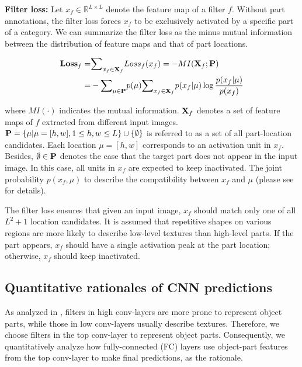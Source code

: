 \documentclass[10pt,twocolumn,letterpaper]{article}
\begin{document}
\textbf{Filter loss:} Let $x_{f}\in\mathbb{R}^{L\times L}$ denote the feature map of a filter $f$. Without part annotations, the filter loss forces $x_{f}$ to be exclusively activated by a specific part of a category. We can summarize the filter loss as the minus mutual information between the distribution of feature maps and that of part locations.
\begin{small}
\begin{equation}
\begin{split}
{\bf Loss}_{f}=&{\sum}_{x_{f}\in{\bf X}_{f}}Loss_{f}(x_{f})=-MI({\bf X}_{f};{\bf P})\\
=&-{\sum}_{\mu\in{\bf P}}p(\mu){\sum}_{x_{f}\in{\bf X}_{f}}p(x_{f}|\mu)\log\frac{p(x_{f}|\mu)}{p(x_{f})}
\end{split}
\end{equation}
\end{small}
where {\small$MI(\cdot)$} indicates the mutual information. {\small${\bf X}_{f}$} denotes a set of feature maps of $f$ extracted from different input images. {\small${\bf P}=\{\mu|\mu=[h,w],1\leq h,w\leq L\}\cup\{\emptyset\}$} is referred to as a set of all part-location candidates. Each location $\mu=[h,w]$ corresponds to an activation unit in $x_{f}$. Besides, $\emptyset\in{\bf P}$ denotes the case that the target part does not appear in the input image. In this case, all units in $x_{f}$ are expected to keep inactivated. The joint probability $p(x_{f},\mu)$ to describe the compatibility between $x_{f}$ and $\mu$ (please see \cite{interpretableCNN} for details).

The filter loss ensures that given an input image, $x_{f}$ should match only one of all $L^2+1$ location candidates. It is assumed that repetitive shapes on various regions are more likely to describe low-level textures than high-level parts. If the part appears, $x_{f}$ should have a single activation peak at the part location; otherwise, $x_{f}$ should keep inactivated.

\subsection{Quantitative rationales of CNN predictions}

As analyzed in \cite{Interpretability}, filters in high conv-layers are more prone to represent object parts, while those in low conv-layers usually describe textures. Therefore, we choose filters in the top conv-layer to represent object parts. Consequently, we quantitatively analyze how fully-connected (FC) layers use object-part features from the top conv-layer to make final predictions, as the rationale.
\end{document}
